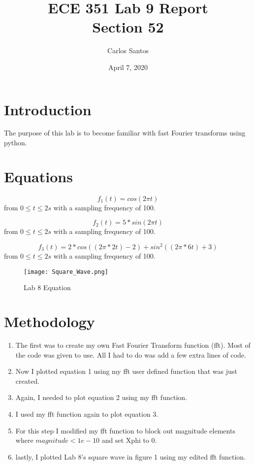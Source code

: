 \documentclass[12pt]{article}
\title{ECE 351 Lab 9 Report \\ Section 52}
\date{April 7, 2020}
\author{Carlos Santos}
\begin{document}
\vspace{\fill}
\maketitle
\vspace{\fill}
\clearpage

\maketitle
\tableofcontents


\section{Introduction}
The purpose of this lab is to become familiar with fast Fourier transforms using python.

\section{Equations}

\begin{equation}
    f_1(t) = cos(2\pi t) 
\end{equation}
from $0 \leq t \leq	2s$ with a sampling frequency of 100.

\begin{equation}
    f_2(t) = 5*sin(2\pi t) 
\end{equation}
from $0 \leq t \leq	2s$ with a sampling frequency of 100.

\begin{equation}
    f_3(t) = 2*cos((2\pi *2t)-2) + sin^2((2\pi * 6t)+3) 
\end{equation}
from $0 \leq t \leq	2s$ with a sampling frequency of 100.

\begin{figure}[H]
\caption{Lab 8 Equation}
\centering
\texttt{[image: Square\_Wave.png]}
\end{figure}

\section{Methodology}
\begin{enumerate}
    \item The first was to create my own Fast Fourier Transform function (fft).  Most of the code was given to use. All I had to do was add a few extra lines of code.
    \item Now I plotted equation 1 using my fft user defined function that was just created.
    \item Again, I needed to plot equation 2 using my fft function.
    \item I used my fft function again to plot equation 3.
    \item For this step I modified my fft function to block out magnitude elements where $magnitude < 1e-10$ and set X\textunderscore phi to 0.
    \item lastly, I plotted Lab 8's square wave in figure 1 using my edited fft function.
\end{enumerate}
\end{document}
